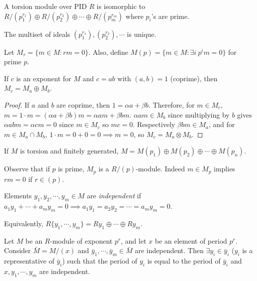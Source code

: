 \documentclass[a4paper,twoside,master.tex]{subfiles}
\begin{document}
\begin{theorem}
    A torsion module over PID $ R $ is isomorphic to $ R/(p_1^{r_1})\oplus R/(p_2^{r_2}) \oplus \cdots \oplus R/(p_m^{r_m}) $ where $ p_i $'s are prime.
\end{theorem}
\begin{theorem}
    The multiset of ideals $ (p_1^{r_1}), (p_2^{r_2}), \cdots $ is unique.
\end{theorem}
\begin{definition}
    Let $ M_r = \{m \in M \colon r m = 0\} $. Also, define $ M(p) = \{m \in M \colon \exists i\ p^i m = 0\} $ for prime $ p $. 
\end{definition}
\begin{claim}
    If $ c $ is an exponent for $ M $ and $ c = ab $ with $ (a,b) = 1 $ (coprime), then $ M_c = M_a \oplus M_b $.
\end{claim}
\begin{proof}
    If $ a $ and $ b $ are coprime, then $ 1 = \alpha a + \beta b $. Therefore, for $ m \in M_c $, $ m = 1 \cdot m = (\alpha a + \beta b)m = \alpha a m + \beta b m $. $ \alpha a m \in M_b $ since multiplying by $ b $ gives $ \alpha a b m = \alpha c m = 0 $ since $ m \in M_c $ so $ m c = 0 $. Respectively $ \beta b m \in M_a $, and for $ m \in M_a \cap M_b $, $ 1 \cdot m = 0 + 0 = 0 \implies m = 0 $, so $ M_c = M_a \otimes M_b $.
\end{proof}
\begin{claim}
    If $ M $ is torsion and finitely generated, $ M = M(p_1) \oplus M(p_2) \oplus \cdots \oplus M(p_n) $. 
\end{claim}
Observe that if $ p $ is prime, $ M_p $ is a $ R/(p) $-module. Indeed $ m \in M_p $ implies $ r m = 0 $ if $ r \in (p) $.
\begin{definition}
    Elements $ y_1, y_2, \cdots, y_m \in M $ are \textit{independent} if $ a_1 y_1 + \cdots + a_m y_m = 0 \implies a_1 y_1 = a_2 y_2 = \cdots = a_m y_m = 0 $.

    Equivalently, $ R \{y_1, \cdots, y_m\} = R y_1 \oplus \cdots \oplus R y_m $.
\end{definition}
\begin{lemma}
    Let $ M $ be an $ R $-module of exponent $ p^r $, and let $ x $ be an element of period $ p^r $. Consider $ \bar{M} = M/(x) $ and $ \bar{y}_1, \cdots, \bar{y}_m \in \bar{M} $ are independent. Then $ \exists y_i \in \bar{y}_i $ ($ y_i $ is a representative of $ \bar{y}_i $) such that the period of $ y_i $ is equal to the period of $ \bar{y}_i $ and $ x, y_1, \cdots, y_m $ are independent.
\end{lemma}
\end{document}
